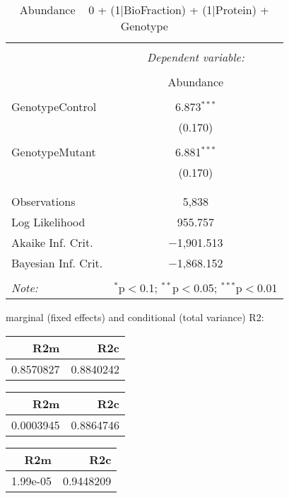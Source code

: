 \documentclass[11pt]{report}
\begin{document}
\begin{table}[!htbp] \centering 
  \caption{Abundance ~ 0 + (1|BioFraction) + (1|Protein) + Genotype} 
  \label{} 
\begin{tabular}{@{\extracolsep{5pt}}lc} 
\\[-1.8ex]\hline 
\hline \\[-1.8ex] 
 & \multicolumn{1}{c}{\textit{Dependent variable:}} \\ 
\cline{2-2} 
\\[-1.8ex] & Abundance \\ 
\hline \\[-1.8ex] 
 GenotypeControl & 6.873$^{***}$ \\ 
  & (0.170) \\ 
  & \\ 
 GenotypeMutant & 6.881$^{***}$ \\ 
  & (0.170) \\ 
  & \\ 
\hline \\[-1.8ex] 
Observations & 5,838 \\ 
Log Likelihood & 955.757 \\ 
Akaike Inf. Crit. & $-$1,901.513 \\ 
Bayesian Inf. Crit. & $-$1,868.152 \\ 
\hline 
\hline \\[-1.8ex] 
\textit{Note:}  & \multicolumn{1}{r}{$^{*}$p$<$0.1; $^{**}$p$<$0.05; $^{***}$p$<$0.01} \\ 
\end{tabular} 
\end{table} 
marginal (fixed effects) and conditional (total variance) R2:

\begin{tabular}{r|r}
\hline
R2m & R2c\\
\hline
0.8570827 & 0.8840242\\
\hline
\end{tabular}

\begin{tabular}{r|r}
\hline
R2m & R2c\\
\hline
0.0003945 & 0.8864746\\
\hline
\end{tabular}

\begin{tabular}{r|r}
\hline
R2m & R2c\\
\hline
1.99e-05 & 0.9448209\\
\hline
\end{tabular}
\end{document}
